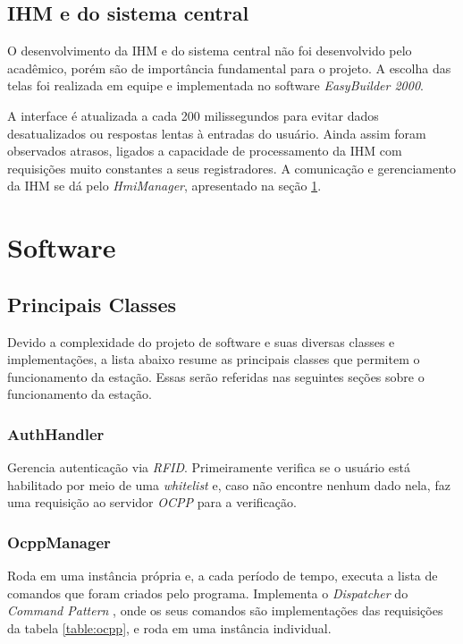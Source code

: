     \subsection{IHM e do sistema central}
    \label{methodology:structure:others}

      O desenvolvimento da \ac{IHM} e do sistema central não foi desenvolvido pelo acadêmico, porém são de importância fundamental para o projeto. A escolha das telas foi realizada em equipe e implementada no software \textit{EasyBuilder 2000}. {}

      A interface é atualizada a cada 200 milissegundos para evitar dados desatualizados ou respostas lentas à entradas do usuário. Ainda assim foram observados atrasos, ligados a capacidade de processamento da \ac{IHM} com requisições muito constantes a seus registradores. A comunicação e gerenciamento da \ac{IHM} se dá pelo \textit{HmiManager}, apresentado na seção \ref{methodology:structure:sw}.

  \section{Software}
  \label{methodology:structure:sw}

    \subsection{Principais Classes}

    Devido a complexidade do projeto de software e suas diversas classes e implementações, a lista abaixo resume as principais classes que permitem o funcionamento da estação. Essas serão referidas nas seguintes seções sobre o funcionamento da estação. 

        \subsubsection{AuthHandler}
          Gerencia autenticação via \textit{\ac{RFID}}. Primeiramente verifica se o usuário está habilitado por meio de uma \textit{whitelist} e, caso não encontre nenhum dado nela, faz uma requisição ao servidor \textit{\ac{OCPP}} para a verificação.
        \subsubsection{OcppManager}
          Roda em uma instância própria e, a cada período de tempo, executa a lista de comandos que foram criados pelo programa. Implementa o \textit{Dispatcher} do \textit{Command Pattern} \cite{book-gof}, onde os seus comandos são implementações das requisições da tabela \ref{table:ocpp}, e roda em uma instância individual.
